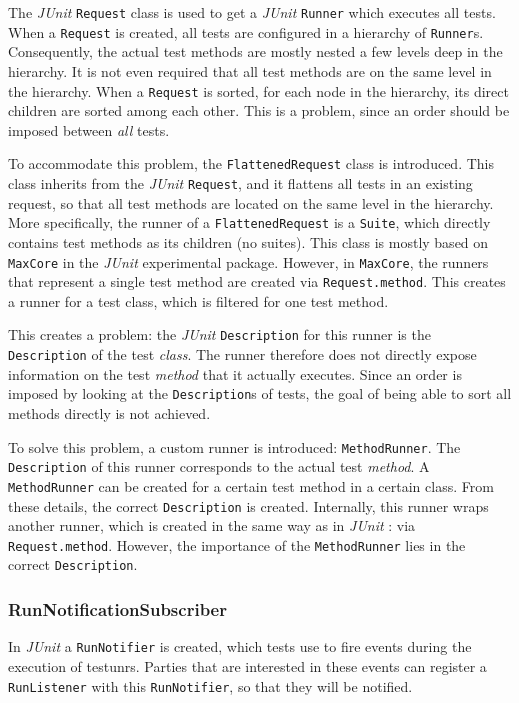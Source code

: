 \documentclass[i2]{oss}
\newcommand{\class}[1]{\texttt{#1}}
\newcommand{\junit}{\emph{JUnit }}
\begin{document}
The \junit \class{Request} class is used to get a \junit \class{Runner} which executes all tests.
When a \class{Request} is created, all tests are configured in a hierarchy of \class{Runner}s.
Consequently, the actual test methods are mostly nested a few levels deep in the hierarchy.
It is not even required that all test methods are on the same level in the hierarchy.
When a \class{Request} is sorted, for each node in the hierarchy, its direct children are sorted among each other.
This is a problem, since an order should be imposed between \emph{all} tests.

To accommodate this problem, the \class{FlattenedRequest} class is introduced.
This class inherits from the \junit \class{Request}, and it flattens all tests in an existing request, so that all test methods are located on the same level in the hierarchy.
More specifically, the runner of a \class{FlattenedRequest} is a \class{Suite}, which directly contains test methods as its children (no suites).
This class is mostly based on \class{MaxCore} in the \junit experimental package.
However, in \class{MaxCore}, the runners that represent a single test method are created via \class{Request.method}.
This creates a runner for a test class, which is filtered for one test method.

This creates a problem: the \junit \class{Description} for this runner is the \class{Description} of the test \emph{class}.
The runner therefore does not directly expose information on the test \emph{method} that it actually executes.
Since an order is imposed by looking at the \class{Description}s of tests, the goal of being able to sort all methods directly is not achieved.

To solve this problem, a custom runner is introduced: \class{MethodRunner}.
The \class{Description} of this runner corresponds to the actual test \emph{method}.
A \class{MethodRunner} can be created for a certain test method in a certain class.
From these details, the correct \class{Description} is created.
Internally, this runner wraps another runner, which is created in the same way as in \junit: via \class{Request.method}.
However, the importance of the \class{MethodRunner} lies in the correct \class{Description}.

\subsubsection{RunNotificationSubscriber}

In \junit a \class{RunNotifier} is created, which tests use to fire events during the execution of testunrs.
Parties that are interested in these events can register a \class{RunListener} with this \class{RunNotifier}, so that they will be notified.
\end{document}
